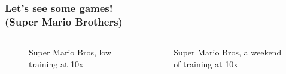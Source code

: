 \documentclass[pdf,11pt]{beamer}
\begin{document}
\begin{frame}
\frametitle{Let's see some games! \\\vspace{-15pt}\large{(Super Mario Brothers)}}
        \begin{columns}
        \begin{column}{0.49\paperwidth}
        \begin{figure}
        \caption{Super Mario Bros, low training at 10x}
        \end{figure}
        \end{column}
        \begin{column}{0.49\paperwidth}
        \begin{figure}
        \caption{Super Mario Bros, a weekend of training at 10x}
        \end{figure}
        \end{column}
        \end{columns}
\end{frame}
\end{document}
